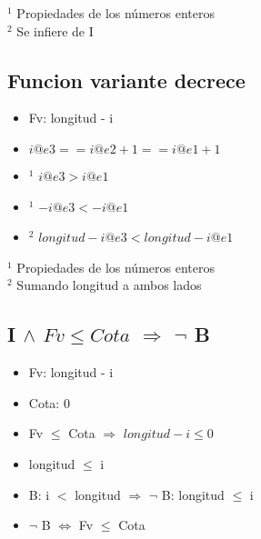 \noindent $ ^1 $ Propiedades de los números enteros\\
$ ^2 $ Se infiere de I\\

\subsection{Funcion variante decrece}
\begin{itemize}
	\item Fv: longitud - i
	\item $ i@e3 == i@e2 + 1 == i@e1 + 1 $
	\item $ ^1 $ $ i@e3 > i@e1 $
	\item $ ^1 $ $ - i@e3 < - i@e1 $
	\item $ ^2 $ \textcolor{NavyBlue}{ $ longitud - i@e3 < longitud - i@e1 $} \checkmark	
\end{itemize}
\vspace{3mm}

\noindent $ ^1 $ Propiedades de los números enteros\\
$ ^2 $ Sumando longitud a ambos lados\\

\subsection{I $ \land $ $ Fv \leq Cota $ $ \Rightarrow $ $ \lnot $ B}
\begin{itemize}
	\item Fv: longitud - i
	\item Cota: 0
	\item Fv $ \leq $ Cota $ \Rightarrow $ $ longitud - i \leq 0 $ 
	\item longitud $ \leq $ i
	\item B: i $ < $ longitud $ \Rightarrow $ $ \lnot $ B: longitud $ \leq $ i
	\item \textcolor{NavyBlue}{ $ \lnot $ B $ \Leftrightarrow $ Fv  $ \leq $ Cota} \checkmark	
\end{itemize}
\vspace{3mm}


